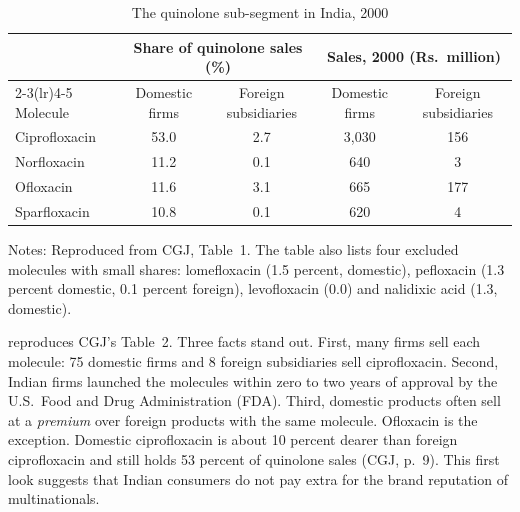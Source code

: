 \begin{table}[htbp]
\centering
\caption{The quinolone sub-segment in India, 2000}\label{tab:05-cgj-table1}
\small
\begin{tabular}{lcccc}
\toprule
 & \multicolumn{2}{c}{Share of quinolone sales (\%)} & \multicolumn{2}{c}{Sales, 2000 (Rs.\ million)} \\
\cmidrule(lr){2-3}\cmidrule(lr){4-5}
Molecule & Domestic firms & Foreign subsidiaries & Domestic firms & Foreign subsidiaries \\
\midrule
Ciprofloxacin & 53.0 & 2.7 & 3,030 & 156 \\
Norfloxacin   & 11.2 & 0.1 & 640 & 3 \\
Ofloxacin     & 11.6 & 3.1 & 665 & 177 \\
Sparfloxacin  & 10.8 & 0.1 & 620 & 4 \\
\bottomrule
\end{tabular}
\par\smallskip
\begin{minipage}{0.92\textwidth}\footnotesize
Notes: Reproduced from CGJ, Table~1. The table also lists four excluded molecules with small shares: lomefloxacin
(1.5 percent, domestic), pefloxacin (1.3 percent domestic, 0.1 percent foreign), levofloxacin (0.0) and nalidixic
acid (1.3, domestic).
\end{minipage}
\end{table}

 reproduces CGJ's Table~2. Three facts stand out. First, many firms sell each molecule: 75
domestic firms and 8 foreign subsidiaries sell ciprofloxacin. Second, Indian firms launched the molecules within zero
to two years of approval by the U.S.\ Food and Drug Administration (FDA). Third, domestic products often sell at a
\emph{premium} over foreign products with the same molecule. Ofloxacin is the exception. Domestic ciprofloxacin is
about 10 percent dearer than foreign ciprofloxacin and still holds 53 percent of quinolone sales (CGJ, p.~9). This
first look suggests that Indian consumers do not pay extra for the brand reputation of multinationals.

